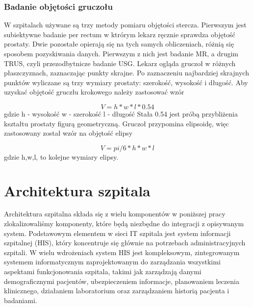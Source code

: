 \documentclass[a4paper,11pt,twoside]{report}
\theoremstyle{definition}
\begin{document}
\subsubsection{Badanie objętości gruczołu}
W szpitalach używane są trzy metody pomiaru objętości stercza. Pierwszym jest subiektywne badanie per rectum w ktrórym lekarz ręcznie sprawdza objętość prostaty. Dwie pozostałe opierają się na tych samych obliczeniach, różnią się sposobem pozyskiwania danych. Pierwszym z nich jest badanie MR, a drugim TRUS, czyli przezodbytnicze badanie USG. Lekarz ogląda gruczoł w różnych płaszczyznach, zaznaczając punkty skrajne. Po zaznaczeniu najbardziej skrajnych punktów wyliczane są trzy wymiary prostaty: szerokość, wysokość i długość. Aby uzyskać objętość gruczłu krokowego należy zastosować wzór 

\[V = h*w* l * 0.54\]
gdzie
h - wysokość
w - szerokość
l - długość
Stała 0.54 jest próbą przybliżenia kształtu prostaty figurą geometryczną. Gruczoł przypomina elipsoidę, więc zastosowany został wzór na objętość elipsy

\[V = pi/6 * h*w*l\]
gdzie h,w,l, to kolejne wymiary elipsy. 

\section{Architektura szpitala}

Architektura szpitalna składa się z wielu komponentów w poniższej pracy zlokalizowaliśmy komponenty, które będą niezbędne do integracji z opisywanym system. Podstawowym elementem w sieci IT szpitala jest system informacji szpitalnej (HIS), który koncentruje się głównie na potrzebach administracyjnych szpitali. W wielu wdrożeniach system HIS jest kompleksowym, zintegrowanym systemem informatycznym zaprojektowanym do zarządzania wszystkimi aspektami funkcjonowania szpitala, takimi jak zarządzają danymi demograficznymi pacjentów, ubezpieczeniem informacje, planowaniem leczenia klinicznego, działaniem laboratorium oraz zarządzaniem historią pacjenta i badaniami.
\end{document}
